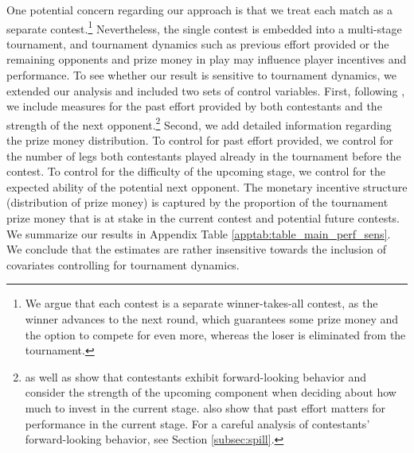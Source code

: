 \documentclass[11pt,a4paper]{article}
\begin{document}
One potential concern regarding our approach is that we treat each match as a separate contest.\footnote{We argue that each contest is a separate winner-takes-all contest, as the winner advances to the next round, which guarantees some prize money and the option to compete for even more, whereas the loser is eliminated from the tournament.} Nevertheless, the single contest is embedded into a multi-stage tournament, and tournament dynamics such as previous effort provided or the remaining opponents and prize money in play may influence player incentives and performance. To see whether our result is sensitive to tournament dynamics, we extended our analysis and included two sets of control variables. First, following , we include measures for the past effort provided by both contestants and the strength of the next opponent.\footnote{ as well as  show that contestants exhibit forward-looking behavior and consider the strength of the upcoming component when deciding about how much to invest in the current stage.  also show that past effort matters for performance in the current stage. For a careful analysis of contestants' forward-looking behavior, see Section \ref{subsec:spill}.} Second, we add detailed information regarding the prize money distribution. To control for past effort provided, we control for the number of legs both contestants played already in the tournament before the contest. To control for the difficulty of the upcoming stage, we control for the expected ability of the potential next opponent. The monetary incentive structure (distribution of prize money) is captured by the proportion of the tournament prize money that is at stake in the current contest and potential future contests. We summarize our results in Appendix Table \ref{apptab:table_main_perf_sens}. We conclude that the estimates are rather insensitive towards the inclusion of covariates controlling for tournament dynamics.\par
\end{document}
